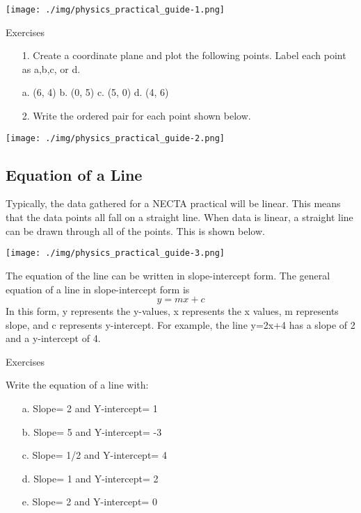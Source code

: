 \begin{center}
\texttt{[image: ./img/physics\_practical\_guide-1.png]}
\end{center}

Exercises
\begin{enumerate}
\item[1.] Create a coordinate plane and plot the following points. Label each point as a,b,c, or d.

a.	(6, 4)     b.  (0, 5)    c.  (5, 0)    d. (4, 6)
\item[2.] Write the ordered pair for each point shown below.
\end{enumerate}

\begin{center}
\texttt{[image: ./img/physics\_practical\_guide-2.png]}
\end{center}

\subsection{Equation of a Line}
Typically, the data gathered for a NECTA practical will be linear. This means that the data points all fall on a straight line. When data is linear, a straight line can be drawn through all of the points. This is shown below.

\begin{center}
\texttt{[image: ./img/physics\_practical\_guide-3.png]}
\end{center}

The equation of the line can be written in slope-intercept form. The general equation of a line in slope-intercept form is $$y=mx+c$$
In this form, y represents the y-values, x represents the x values, m represents slope, and c represents y-intercept. For example, the line y=2x+4 has a slope of 2 and a y-intercept of 4.

Exercises

Write the equation of a line with:
\begin{enumerate}
\item[a.] Slope= 2 and Y-intercept= 1
\item[b.] Slope= 5 and Y-intercept= -3
\item[c.] Slope= 1/2 and Y-intercept= 4
\item[d.] Slope= 1 and Y-intercept= 2
\item[e.] Slope= 2 and Y-intercept= 0
\end{enumerate}

